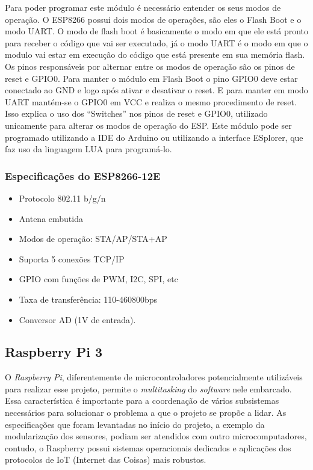     Para poder programar este módulo é necessário entender os seus modos de operação. O ESP8266 possui dois modos de operações, são eles o Flash Boot e o modo UART. O modo de flash boot é basicamente o modo em que ele está pronto para receber o código que vai ser executado, já o modo UART é o modo em que o modulo vai estar em execução do código que está presente em sua memória flash. Os pinos responsáveis por alternar entre os modos de operação são os pinos de reset e GPIO0. Para manter o módulo em Flash Boot o pino GPIO0 deve estar conectado ao GND e logo após ativar e desativar o reset. E para manter em modo UART mantém-se o GPIO0 em VCC e realiza o mesmo procedimento de reset. Isso explica o uso dos “Switches” nos pinos de reset e GPIO0, utilizado unicamente para alterar os modos de operação do ESP.
	Este módulo pode ser programado utilizando a IDE do Arduino ou utilizando a interface ESplorer, que faz uso da linguagem LUA para programá-lo.

\subsubsection{Especificações do ESP8266-12E}

\begin{itemize}
\item 
	Protocolo 802.11 b/g/n
\item
	Antena embutida
\item
	Modos de operação: STA/AP/STA+AP
\item
	Suporta 5 conexões TCP/IP
\item
	GPIO com funções de PWM, I2C, SPI, etc
\item
	Taxa de transferência: 110-460800bps
\item
	Conversor AD (1V de entrada).
\end{itemize}

\subsection{Raspberry Pi 3}

O \textit{Raspberry Pi}, diferentemente de microcontroladores potencialmente utilizáveis para realizar esse projeto, permite o \textit{multitasking} do \textit{software} nele embarcado. Essa característica é importante para a coordenação de vários subsistemas necessários para solucionar o problema a que o projeto se propõe a lidar. As especificações que foram levantadas no início do projeto, a exemplo da modularização dos sensores, podiam ser atendidos com outro microcomputadores, contudo, o Raspberry possui sistemas operacionais dedicados e aplicações dos protocolos de IoT (Internet das Coisas) mais robustos. 

